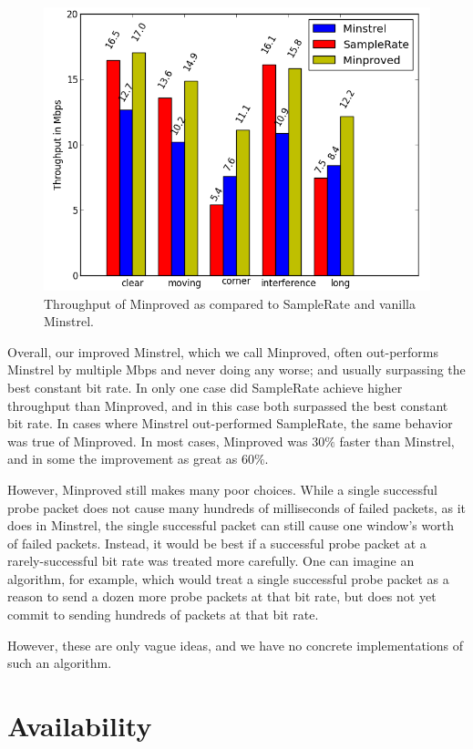 \documentclass[twocolumn,10pt]{article}
\begin{document}
\begin{figure}[htb]
  \includegraphics[width=\linewidth]{mnVSspVSmp1.png}
  \caption{Throughput of Minproved as compared to SampleRate and
    vanilla Minstrel.}
\label{figure:4}
\end{figure}

Overall, our improved Minstrel, which we call Minproved, often
out-performs Minstrel by multiple Mbps and never doing any worse; and
usually surpassing the best constant bit rate.  In only one case did
SampleRate achieve higher throughput than Minproved, and in this case
both surpassed the best constant bit rate.  In cases where Minstrel
out-performed SampleRate, the same behavior was true of Minproved.  In
most cases, Minproved was $30\%$ faster than Minstrel, and in some the
improvement as great as $60\%$.

However, Minproved still makes many poor choices.  While a single
successful probe packet does not cause many hundreds of milliseconds
of failed packets, as it does in Minstrel, the single successful
packet can still cause one window's worth of failed packets.  Instead,
it would be best if a successful probe packet at a rarely-successful
bit rate was treated more carefully.  One can imagine an algorithm,
for example, which would treat a single successful probe packet as a
reason to send a dozen more probe packets at that bit rate, but does
not yet commit to sending hundreds of packets at that bit rate.

However, these are only vague ideas, and we have no concrete
implementations of such an algorithm.


\section{Availability} \label{sec:availability}
\end{document}
